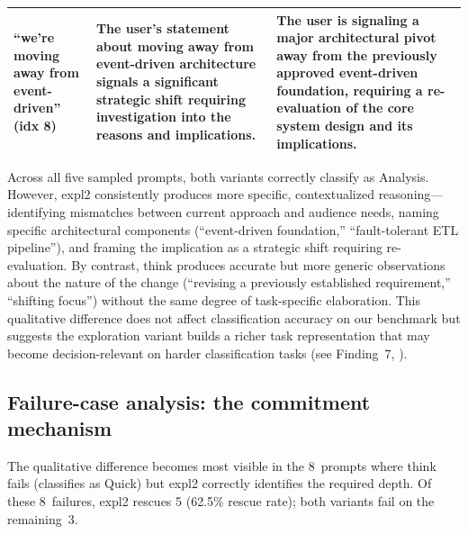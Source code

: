 \documentclass[11pt,a4paper]{article}
\begin{document}
\begin{table}[htbp]
\begin{tabular}{@{}p{3.2cm}p{5.4cm}p{5.4cm}@{}}
``we're moving away from event-driven''
(idx 8)
&
The user's statement about moving away from event-driven architecture
signals a significant strategic shift requiring investigation into the
reasons and implications.
&
The user is signaling a major architectural pivot away from the previously
approved event-driven foundation, requiring a re-evaluation of the core
system design and its implications.
\\

\bottomrule
\end{tabular}
\end{table}

\noindent Across all five sampled prompts, both variants correctly classify
as Analysis.  However, \textsf{expl2} consistently produces more specific,
contextualized reasoning---identifying mismatches between current approach
and audience needs, naming specific architectural components (``event-driven
foundation,'' ``fault-tolerant ETL pipeline''), and framing the implication
as a strategic shift requiring re-evaluation.  By contrast, \textsf{think}
produces accurate but more generic observations about the nature of the
change (``revising a previously established requirement,'' ``shifting focus'')
without the same degree of task-specific elaboration.  This qualitative
difference does not affect classification accuracy on our benchmark but
suggests the exploration variant builds a richer task representation that
may become decision-relevant on harder classification tasks (see Finding~7,
).

\subsection{Failure-case analysis: the commitment mechanism}
\label{sec:qualitative}

The qualitative difference becomes most visible in the 8~prompts where
\textsf{think} fails (classifies as Quick) but \textsf{expl2} correctly
identifies the required depth.  Of these 8~failures, \textsf{expl2} rescues
5 (62.5\% rescue rate); both variants fail on the remaining~3.
\end{document}
